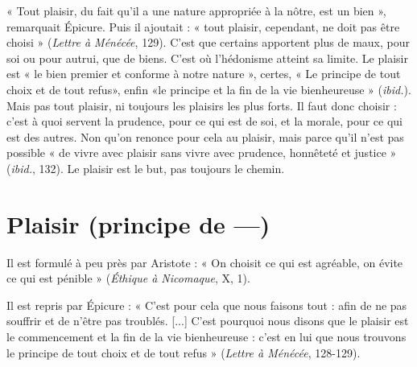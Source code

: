 « Tout plaisir, du fait qu’il a une nature appropriée à la nôtre, est un bien »,
remarquait Épicure. Puis il ajoutait : « tout plaisir, cependant, ne doit pas être
choisi » ({\it Lettre à Ménécée}, 129). C’est que certains apportent plus de maux,
pour soi ou pour autrui, que de biens. C’est où l’hédonisme atteint sa limite.
Le plaisir est « le bien premier et conforme à notre nature », certes, « Le principe
de tout choix et de tout refus», enfin «le principe et la fin de la vie
bienheureuse » ({\it ibid.}). Mais pas tout plaisir, ni toujours les plaisirs les plus
forts. Il faut donc choisir : c’est à quoi servent la prudence, pour ce qui est de
soi, et la morale, pour ce qui est des autres. Non qu’on renonce pour cela au
plaisir, mais parce qu’il n’est pas possible « de vivre avec plaisir sans vivre avec
prudence, honnêteté et justice » ({\it ibid.}, 132). Le plaisir est le but, pas toujours
le chemin.

\section{Plaisir (principe de —)}
Il est formulé à peu près par Aristote : « On
choisit ce qui est agréable, on évite ce qui est
pénible » ({\it Éthique à Nicomaque}, X, 1).

Il est repris par Épicure : « C’est pour cela que nous faisons tout : afin de
ne pas souffrir et de n’être pas troublés. [...] C’est pourquoi nous disons que le
plaisir est le commencement et la fin de la vie bienheureuse : c’est en lui que
nous trouvons le principe de tout choix et de tout refus » ({\it Lettre à Ménécée},
128-129).

